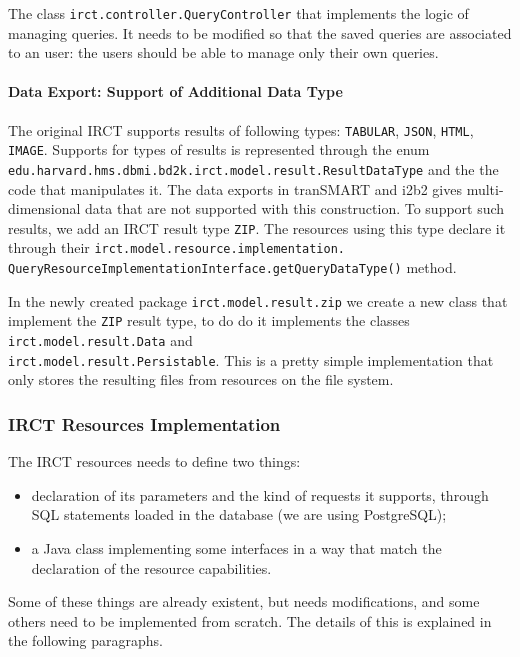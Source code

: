The class \verb|irct.controller.QueryController| that implements the logic of managing queries.
It needs to be modified so that the saved queries are associated to an user: the users should be able to manage only their own queries.

\paragraph{Data Export: Support of Additional Data Type}

The original IRCT supports results of following types: \verb|TABULAR|, \verb|JSON|, \verb|HTML|, \verb|IMAGE|.
Supports for types of results is represented through the enum \verb|edu.harvard.hms.dbmi.bd2k.irct.model.result.ResultDataType| and the the code that manipulates it.
The data exports in tranSMART and i2b2 gives multi-dimensional data that are not supported with this construction.
To support such results, we add an IRCT result type \verb|ZIP|.
The resources using this type declare it through their \verb|irct.model.resource.implementation.| \\
\verb|QueryResourceImplementationInterface.getQueryDataType()| method.

In the newly created package \verb|irct.model.result.zip| we create a new class that implement the \verb|ZIP| result type, to do do it implements the classes
\verb|irct.model.result.Data| and \\
\verb|irct.model.result.Persistable|.
This is a pretty simple implementation that only stores the resulting files from resources on the file system.


\subsubsection{IRCT Resources Implementation}

The IRCT resources needs to define two things:
\begin{itemize}
    \item declaration of its parameters and the kind of requests it supports, through SQL statements loaded in the database (we are using PostgreSQL);
    \item a Java class implementing some interfaces in a way that match the declaration of the resource capabilities.
\end{itemize}

Some of these things are already existent, but needs modifications, and some others need to be implemented from scratch.
The details of this is explained in the following paragraphs.

